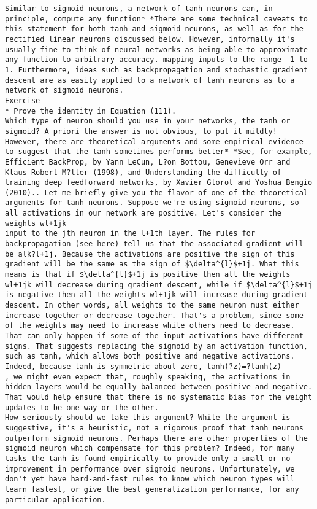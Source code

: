 \begin{lstlisting}
Similar to sigmoid neurons, a network of tanh neurons can, in principle, compute any function* *There are some technical caveats to this statement for both tanh and sigmoid neurons, as well as for the rectified linear neurons discussed below. However, informally it's usually fine to think of neural networks as being able to approximate any function to arbitrary accuracy. mapping inputs to the range -1 to 1. Furthermore, ideas such as backpropagation and stochastic gradient descent are as easily applied to a network of tanh neurons as to a network of sigmoid neurons.
Exercise
* Prove the identity in Equation (111). 
Which type of neuron should you use in your networks, the tanh or sigmoid? A priori the answer is not obvious, to put it mildly! However, there are theoretical arguments and some empirical evidence to suggest that the tanh sometimes performs better* *See, for example, Efficient BackProp, by Yann LeCun, L?on Bottou, Genevieve Orr and Klaus-Robert M?ller (1998), and Understanding the difficulty of training deep feedforward networks, by Xavier Glorot and Yoshua Bengio (2010).. Let me briefly give you the flavor of one of the theoretical arguments for tanh neurons. Suppose we're using sigmoid neurons, so all activations in our network are positive. Let's consider the weights wl+1jk
input to the jth neuron in the l+1th layer. The rules for backpropagation (see here) tell us that the associated gradient will be alk?l+1j. Because the activations are positive the sign of this gradient will be the same as the sign of $\delta^{l}$+1j. What this means is that if $\delta^{l}$+1j is positive then all the weights wl+1jk will decrease during gradient descent, while if $\delta^{l}$+1j is negative then all the weights wl+1jk will increase during gradient descent. In other words, all weights to the same neuron must either increase together or decrease together. That's a problem, since some of the weights may need to increase while others need to decrease. That can only happen if some of the input activations have different signs. That suggests replacing the sigmoid by an activation function, such as tanh, which allows both positive and negative activations. Indeed, because tanh is symmetric about zero, tanh(?z)=?tanh(z)
, we might even expect that, roughly speaking, the activations in hidden layers would be equally balanced between positive and negative. That would help ensure that there is no systematic bias for the weight updates to be one way or the other.
How seriously should we take this argument? While the argument is suggestive, it's a heuristic, not a rigorous proof that tanh neurons outperform sigmoid neurons. Perhaps there are other properties of the sigmoid neuron which compensate for this problem? Indeed, for many tasks the tanh is found empirically to provide only a small or no improvement in performance over sigmoid neurons. Unfortunately, we don't yet have hard-and-fast rules to know which neuron types will learn fastest, or give the best generalization performance, for any particular application.

\end{lstlisting}
